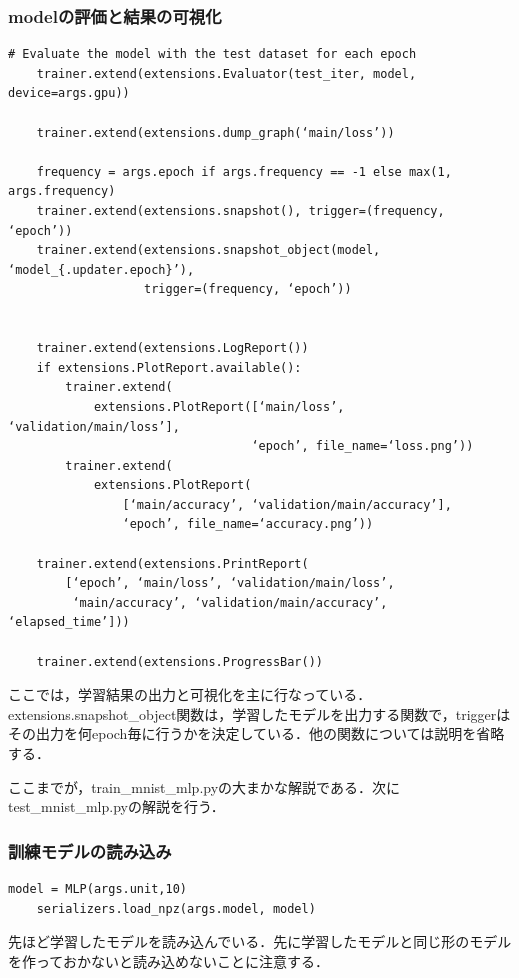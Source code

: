   \subsubsection{modelの評価と結果の可視化}
\begin{lstlisting}[basicstyle=\ttfamily\footnotesize, frame=single]
    # Evaluate the model with the test dataset for each epoch
    trainer.extend(extensions.Evaluator(test_iter, model, device=args.gpu))

    trainer.extend(extensions.dump_graph(‘main/loss’))

    frequency = args.epoch if args.frequency == -1 else max(1, args.frequency)
    trainer.extend(extensions.snapshot(), trigger=(frequency, ‘epoch’))
    trainer.extend(extensions.snapshot_object(model, ‘model_{.updater.epoch}’),
                   trigger=(frequency, ‘epoch’))


    trainer.extend(extensions.LogReport())
    if extensions.PlotReport.available():
        trainer.extend(
            extensions.PlotReport([‘main/loss’, ‘validation/main/loss’],
                                  ‘epoch’, file_name=‘loss.png’))
        trainer.extend(
            extensions.PlotReport(
                [‘main/accuracy’, ‘validation/main/accuracy’],
                ‘epoch’, file_name=‘accuracy.png’))

    trainer.extend(extensions.PrintReport(
        [‘epoch’, ‘main/loss’, ‘validation/main/loss’,
         ‘main/accuracy’, ‘validation/main/accuracy’, ‘elapsed_time’]))

    trainer.extend(extensions.ProgressBar())
\end{lstlisting}
ここでは，学習結果の出力と可視化を主に行なっている．extensions.snapshot\_object関数は，学習したモデルを出力する関数で，triggerはその出力を何epoch毎に行うかを決定している．他の関数については説明を省略する．

ここまでが，train\_mnist\_mlp.pyの大まかな解説である．次にtest\_mnist\_mlp.pyの解説を行う．

 \subsubsection{訓練モデルの読み込み}
\begin{lstlisting}[basicstyle=\ttfamily\footnotesize, frame=single]
    model = MLP(args.unit,10)
    serializers.load_npz(args.model, model)
\end{lstlisting}
先ほど学習したモデルを読み込んでいる．先に学習したモデルと同じ形のモデルを作っておかないと読み込めないことに注意する．
